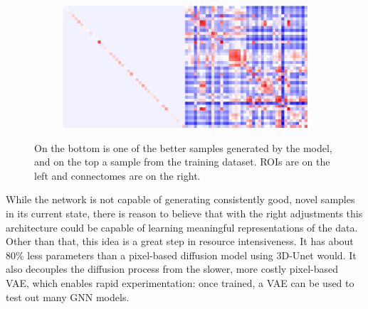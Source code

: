 \begin{figure}[!h]
\begin{subfigure}[b]{0.4\textwidth}
		\end{subfigure}
		\par\bigskip
		\begin{subfigure}[b]{0.8\textwidth}
			\centering
			\includegraphics[width=\textwidth]{figures/good-roi-sample.png}
		\end{subfigure}
		\caption{On the bottom is one of the better samples generated by the model, and on the top a sample from the training dataset. ROIs are on the left and connectomes are on the right.}
		\label{fig:roi-samples}
	\end{figure}
	
	While the network is not capable of generating consistently good, novel samples in its current state, there is reason to believe that with the right adjustments this architecture could be capable of learning meaningful representations of the data. Other than that, this idea is a great step in resource intensiveness. It has about 80\% less parameters than a pixel-based diffusion model using 3D-Unet would. It also decouples the diffusion process from the slower, more costly pixel-based VAE, which enables rapid experimentation: once trained, a VAE can be used to test out many GNN models.
	

